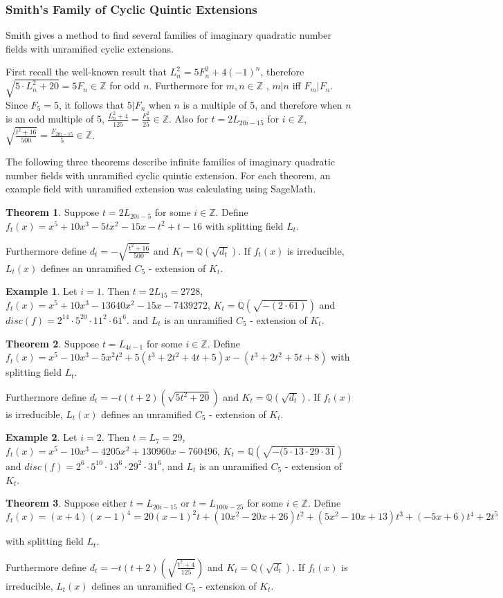 \documentclass[12pt]{extarticle}
\newcommand{\Q}{\mathbb{Q}}
\newcommand{\Z}{\mathbb{Z}}
\newcommand{\<}{\langle}
\renewcommand{\>}{\rangle}
\theoremstyle{definition}
\newtheorem{theorem}{Theorem}
\newtheorem*{example}{Example}
\begin{document}
\subsubsection{Smith's Family of Cyclic Quintic Extensions}
Smith \cite{SMITH} gives a method to find several families of imaginary quadratic number fields with unramified cyclic extensions. \par
 First recall the well-known result that $L_n^2 = 5F_n^2+4(-1)^n$, therefore $\sqrt{5 \cdot L_n^2+20} = 5F_n \in \Z$ for odd $n$. Furthermore for $m,n \in \Z$ , $m|n$ iff $F_m | F_n$. Since $F_5 = 5$, it follows that $5| F_n $ when $n$ is a multiple of 5, and therefore when $n$ is an odd multiple of 5, $\frac{L_n^2+4}{125} = \frac{F_n^2}{25} \in \Z$. Also for $t = 2L_{20i-15}$ for $i \in \Z$, $\sqrt{\frac{t^2+16}{500}} = \frac{F_{20i-15}}{5} \in \Z$. \par 
The following three theorems describe infinite families of imaginary quadratic number fields with unramified cyclic quintic extension. For each theorem, an example field with unramified extension was calculating using SageMath. 
\begin{theorem}
Suppose $t = 2L_{20i-5}$ for some $i \in \Z$. Define $f_t(x) = x^5 + 10x^3 - 5tx^2-15x-t^2+t-16$ with splitting field $L_t$. \par 
Furthermore define $d_t = -\sqrt{\frac{t^2+16}{500}}$ and $K_t = \Q(\sqrt{d_t})$. If $f_t(x)$ is irreducible, $L_t(x)$ defines an unramified $C_5$ - extension of $K_t$. 
\end{theorem}
\begin{example}
Let $i=1$. Then $t=2L_{15} = 2728$, $f_t(x) = x^5 + 10x^3 - 13640x^2 - 15x - 7439272$, $K_t = \Q(\sqrt{-(2 \cdot 61)})$ and $disc(f) = 2^{14} \cdot 5^{20} \cdot 11^2 \cdot 61^6$. and $L_t$ is an unramified $C_5$ - extension of $K_t$. 
\end{example}
\begin{theorem}
Suppose $t = L_{4i-1}$ for some $i \in \Z$. Define $f_t(x) = x^5 -10x^3 - 5x^2t^2+5(t^3+2t^2+4t+5)x-(t^3+2t^2+5t+8)$ with splitting field $L_t$. \par 
Furthermore define $d_t = -t(t+2)(\sqrt{5t^2+20})$ and $K_t = \Q(\sqrt{d_t})$. If $f_t(x)$ is irreducible, $L_t(x)$ defines an unramified $C_5$ - extension of $K_t$.
\end{theorem}
\begin{example}
Let $i=2$. Then $t=L_{7} = 29$, $f_t(x) = x^5 - 10x^3 - 4205x^2 + 130960x - 760496$, $K_t = \Q(\sqrt{-( 5 \cdot 13 \cdot 29 \cdot 31})$ and $disc(f) =2^6 \cdot 5^{10} \cdot 13^6 \cdot 29^2 \cdot 31^6$,  and $L_t$ is an unramified $C_5$ - extension of $K_t$. 
\end{example}
\begin{theorem}
Suppose either $t = L_{20i-15}$ or $t = L_{100i-25}$ for some $i \in \Z$. Define $f_t(x) = (x+4)(x-1)^4 = 20(x-1)^2t + (10x^2-20x+26)t^2 + (5x^2-10x+13)t^3 +(-5x+6)t^4 + 2t^5$

 with splitting field $L_t$. \par 
 Furthermore define $d_t = -t(t+2)\left(\sqrt{\frac{t^2+4}{125}}\right)$ and $K_t = \Q(\sqrt{d_t})$. If $f_t(x)$ is irreducible, $L_t(x)$ defines an unramified $C_5$ - extension of $K_t$. 
\end{theorem}
\end{document}
